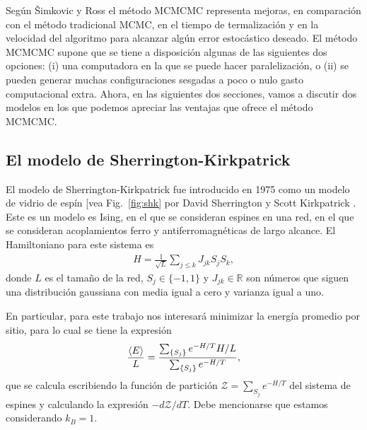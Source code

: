 \documentclass[letterpaper,superscriptaddress,aps,pra,nolongbibliography,twocolumn,showpacs,floatfix,10pt]{revtex4-2} %
\renewcommand{\>}{\rangle}
\newcommand{\<}{\langle}
\newcommand{\Fref}[1]{Fig.~\ref{#1}}
\newcommand{\shk}{Sherrington-Kirkpatrick}
\newcommand{\syr}{Šimkovic y Ross}
\begin{document}
Según \syr{} el método MCMCMC representa mejoras, en comparación con 
el método tradicional MCMC, en el tiempo de termalización y en la 
velocidad del algoritmo para alcanzar algún error estocástico deseado. 
El método MCMCMC supone que se tiene a disposición algunas de las 
siguientes dos opciones: (i) una computadora en la que se puede hacer
paralelización, o (ii) se pueden generar muchas configuraciones sesgadas
a poco o nulo gasto computacional extra. 
Ahora, en las siguientes dos secciones, vamos a discutir dos modelos
en los que podemos apreciar las ventajas que ofrece el método MCMCMC.

\subsection{El modelo de Sherrington-Kirkpatrick}\label{sec:Sh-k}
El modelo de \shk{} fue introducido en 1975 como un modelo de vidrio de 
espín [vea \Fref{fig:shk} por David Sherrington y Scott Kirkpatrick \cite{panchenko2012sherrington}. 
Este es un modelo es Ising, en el que se consideran espines en una red, 
en el que se consideran acoplamientos ferro y antiferromagnéticas de largo alcance.
El Hamiltoniano para este sistema es  
\begin{align*}
H=\frac{1}{\sqrt{L}}\sum_{j\leq k}J_{jk}S_jS_k,
\end{align*}	
donde $L$ es el tamaño de la red, $S_j\in \{ -1, 1\}$ y $J_{jk}\in \mathbb{R}$
son números que siguen una distribución gaussiana con media igual a cero	
y varianza igual a uno.

En particular, para este trabajo nos interesará minimizar la energía promedio
por sitio, para lo cual se tiene la expresión
\begin{align}
\frac{\expval{E}}{L}=\frac{\sum_{\{S_j\}}e^{-H/T}H/L}{\sum_{\{S_j\}}e^{-H/T}},
\end{align}
que se calcula escribiendo la función de partición 
$\mathcal{Z}=\sum_{S_j}e^{-H/T}$ del sistema 
de espines y calculando la expresión $-d\mathcal{Z}/dT$. Debe mencionarse
que estamos considerando $k_B=1$.
\end{document}
